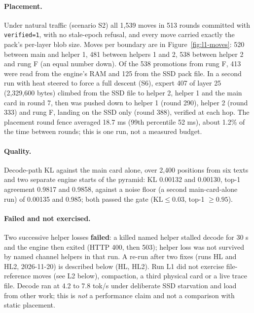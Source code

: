 \documentclass[11pt]{article}
\begin{document}
\paragraph{Placement.} Under natural traffic (scenario S2) all 1,539 moves in 513 rounds committed with
\texttt{verified=1}, with no stale-epoch refusal, and every move carried exactly the pack's per-layer blob size. Moves per
boundary are in Figure~\ref{fig:l1-moves}: 520 between main and helper 1, 481 between helpers 1 and 2, 538 between helper 2 and
rung F (an equal number down). Of the 538 promotions from rung F, 413 were read from the engine's RAM and 125 from the SSD pack
file. In a second run with heat steered to force a full descent (S6), expert 407 of layer 25 (2,329,600 bytes) climbed from the
SSD file to helper 2, helper 1 and the main card in round 7, then was pushed down to helper 1 (round 290), helper 2 (round 333)
and rung F, landing on the SSD only (round 388), verified at each hop. The placement round fence averaged 18.7 ms (99th
percentile 52 ms), about 1.2\% of the time between rounds; this is one run, not a measured budget.

\paragraph{Quality.} Decode-path KL against the main card alone, over 2,400 positions from six texts and two separate engine
starts of the pyramid: KL 0.00132 and 0.00130, top-1 agreement 0.9817 and 0.9858, against a noise floor (a second main-card-alone
run) of 0.00135 and 0.985; both passed the gate ($\mathrm{KL}\le 0.03$, top-1 $\ge 0.95$).

\paragraph{Failed and not exercised.} Two successive helper losses \textbf{failed}: a killed named helper stalled decode for
30 s and the engine then exited (HTTP 400, then 503); helper loss was not survived by named channel helpers in that run. A re-run after two fixes (runs HL and HL2, 2026-11-20) is described below (HL, HL2). Run L1 did not exercise file-reference moves (see L2 below), compaction, a third physical card or a live trace file. Decode ran at 4.2 to
7.8 tok/s under deliberate SSD starvation and load from other work; this is \emph{not} a performance claim and not a comparison
with static placement.
\end{document}
